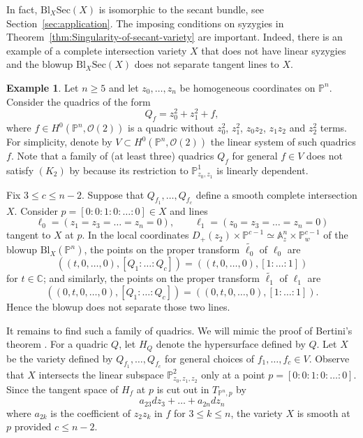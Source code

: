\documentclass[a4paper]{amsart}
\numberwithin{equation}{section}
\theoremstyle{plain}
\theoremstyle{definition}
\newtheorem{exa}[thm]{Example}
\theoremstyle{remark}
\numberwithin{figure}{section}
\numberwithin{table}{section}
\numberwithin{equation}{section}
\def \AA {\mathbb{A}}
\def \CC {\mathbb{C}}
\def \PP {\mathbb{P}}
\def \Ocal {\mathcal{O}}
\begin{document}
In fact, $\mathrm{Bl}_X \mathrm{Sec}(X)$ is isomorphic to the secant bundle, see Section~\ref{sec:application}.
The imposing conditions on syzygies in Theorem~\ref{thm:Singularity-of-secant-variety} are important.
Indeed, there is an example of a complete intersection variety $X$ that does not have linear syzygies and the blowup $\mathrm{Bl}_X \mathrm{Sec}(X)$ does not separate tangent lines to $X$.

\begin{exa} \label{exa:Imposing-conditions-on-syzygies-needed}
    Let $n \geq 5$ and let $z_0, \dots, z_n$ be homogeneous coordinates on $\PP^n$.
    Consider the quadrics of the form
     \[
      Q_f = z_0^2 + z_1^2 + f,
     \]
    where $f \in H^0(\PP^n, \Ocal(2))$ is a quadric without $z_0^2$, $z_1^2$, $z_0z_2$, $z_1z_2$ and $z_2^2$ terms.
    For simplicity, denote by $V \subset H^0(\PP^n, \Ocal(2))$ the linear system of such quadrics $f$.
    Note that a family of (at least three) quadrics $Q_f$ for general $f \in V$ does not satisfy $(K_2)$ by \cite[Lemma~2.4]{Vermeire2001} because its restriction to $\PP_{z_0,z_1}^1$ is linearly dependent.
    
    Fix $3 \leq c \leq n-2$.
    Suppose that $Q_{f_1}, \dots, Q_{f_c}$ define a smooth complete intersection $X$.
    Consider $p = [0:0:1:0:\dots:0] \in X$ and lines
     \[
      \ell_0 = (z_1 = z_3 = \dots = z_n = 0), \qquad \ell_1 = (z_0 = z_3 = \dots = z_n = 0)
     \]
    tangent to $X$ at $p$.
    In the local coordinates $D_{+}(z_2) \times \PP^{c-1} \simeq \AA_{z}^n \times \PP_{w}^{c-1}$ of the blowup $\mathrm{Bl}_{X}(\PP^n)$, the points on the proper transform $\widetilde{\ell_0}$ of $\ell_0$ are
     \[
      ((t,0,\dots,0), [Q_1: \dots : Q_c]) = ((t,0,\dots,0), [1: \dots :1])
     \]
    for $t \in \CC$; and similarly, the points on the proper transform $\widetilde{\ell_1}$ of $\ell_1$ are
     \[
      ((0,t,0,\dots,0), [Q_1: \dots : Q_c]) = ((0,t,0,\dots,0), [1: \dots :1]).
     \]
    Hence the blowup does not separate those two lines.

    It remains to find such a family of quadrics.
    We will mimic the proof of Bertini's theorem \cite[Theorem~II.8.18]{Hartshorne1977}.
    For a quadric $Q$, let $H_Q$ denote the hypersurface defined by $Q$.
    Let $X$ be the variety defined by $Q_{f_1}, \dots, Q_{f_c}$ for general choices of $f_1, \dots, f_c \in V$.
    Observe that $X$ intersects the linear subspace $\PP_{z_0,z_1,z_2}^{2}$ only at a point $p = [0:0:1:0:\dots:0]$.
    Since the tangent space of $H_{f}$ at $p$ is cut out in $T_{\PP^n,p}$ by
     \[
      a_{23}dz_{3} + \dots + a_{2n}dz_n
     \]
    where $a_{2k}$ is the coefficient of $z_2z_k$ in $f$ for $3 \leq k \leq n$, the variety $X$ is smooth at $p$ provided $c \leq n-2$.
    

\end{exa}
\end{document}
